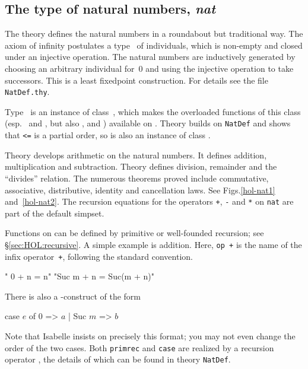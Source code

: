 \subsection{The type of natural numbers, \textit{nat}}

The theory  defines the natural numbers in a roundabout but
traditional way.  The axiom of infinity postulates a type~ of
individuals, which is non-empty and closed under an injective operation.  The
natural numbers are inductively generated by choosing an arbitrary individual
for~0 and using the injective operation to take successors.  This is a least
fixedpoint construction.  For details see the file \texttt{NatDef.thy}.

Type~ is an instance of class~, which makes the
overloaded functions of this class (esp.\ \cdx{<} and \cdx{<=}, but also
,  and ) available on .  Theory
 builds on \texttt{NatDef} and shows that {\tt<=} is a partial order,
so  is also an instance of class .

Theory  develops arithmetic on the natural numbers.  It defines
addition, multiplication and subtraction.  Theory  defines
division, remainder and the ``divides'' relation.  The numerous theorems
proved include commutative, associative, distributive, identity and
cancellation laws.  See Figs.\ts\ref{hol-nat1} and~\ref{hol-nat2}.  The
recursion equations for the operators \texttt{+}, \texttt{-} and \texttt{*} on
\texttt{nat} are part of the default simpset.

Functions on  can be defined by primitive or well-founded recursion;
see \S\ref{sec:HOL:recursive}.  A simple example is addition.
Here, \texttt{op +} is the name of the infix operator~\texttt{+}, following
the standard convention.
\begin{ttbox}
  "    0 + n = n"
  "Suc m + n = Suc(m + n)"
\end{ttbox}
There is also a -construct
of the form
\begin{ttbox}
case \(e\) of 0 => \(a\) | Suc \(m\) => \(b\)
\end{ttbox}
Note that Isabelle insists on precisely this format; you may not even change
the order of the two cases.
Both \texttt{primrec} and \texttt{case} are realized by a recursion operator
, the details of which can be found in theory \texttt{NatDef}.

